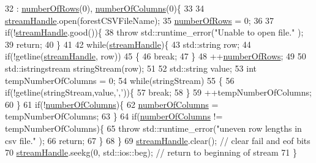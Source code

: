 \begin{DoxyCode}
32                                                           : \hyperlink{classfp_1_1csvHandle_a07cf6b14355c5fa81643a7bb6e9c681f}{numberOfRows}(0), 
      \hyperlink{classfp_1_1csvHandle_ae3e5280846df348d0b1b86b78f2e3682}{numberOfColumns}(0)\{
33 
34                 \hyperlink{classfp_1_1csvHandle_a42c4ad8f38a95c724dfa2b173991a524}{streamHandle}.open(forestCSVFileName);
35                 \hyperlink{classfp_1_1csvHandle_a07cf6b14355c5fa81643a7bb6e9c681f}{numberOfRows} = 0;
36 
37                 \textcolor{keywordflow}{if}(!\hyperlink{classfp_1_1csvHandle_a42c4ad8f38a95c724dfa2b173991a524}{streamHandle}.good())\{
38                     \textcolor{keywordflow}{throw} std::runtime\_error(\textcolor{stringliteral}{"Unable to open file."} );
39                     \textcolor{keywordflow}{return};
40                 \}
41 
42                 \textcolor{keywordflow}{while}(\hyperlink{classfp_1_1csvHandle_a42c4ad8f38a95c724dfa2b173991a524}{streamHandle})\{
43                     std::string row;
44                     \textcolor{keywordflow}{if}(!getline(\hyperlink{classfp_1_1csvHandle_a42c4ad8f38a95c724dfa2b173991a524}{streamHandle}, row))
45                     \{
46                         \textcolor{keywordflow}{break};
47                     \}
48                     ++\hyperlink{classfp_1_1csvHandle_a07cf6b14355c5fa81643a7bb6e9c681f}{numberOfRows};
49 
50                     std::istringstream stringStream(row);
51 
52                     std::string value;
53                     \textcolor{keywordtype}{int} tempNumberOfColumns = 0;
54                     \textcolor{keywordflow}{while}(stringStream)
55                     \{
56                         \textcolor{keywordflow}{if}(!getline(stringStream,value,\textcolor{charliteral}{','}))\{
57                             \textcolor{keywordflow}{break};
58                         \}
59                         ++tempNumberOfColumns;
60                     \}
61                     \textcolor{keywordflow}{if}(!\hyperlink{classfp_1_1csvHandle_ae3e5280846df348d0b1b86b78f2e3682}{numberOfColumns})\{
62                         \hyperlink{classfp_1_1csvHandle_ae3e5280846df348d0b1b86b78f2e3682}{numberOfColumns} = tempNumberOfColumns; 
63                     \}
64                     \textcolor{keywordflow}{if}(\hyperlink{classfp_1_1csvHandle_ae3e5280846df348d0b1b86b78f2e3682}{numberOfColumns} != tempNumberOfColumns)\{
65                         \textcolor{keywordflow}{throw} std::runtime\_error(\textcolor{stringliteral}{"uneven row lengths in csv file."} );
66                         \textcolor{keywordflow}{return};
67                     \}
68                 \}
69                 \hyperlink{classfp_1_1csvHandle_a42c4ad8f38a95c724dfa2b173991a524}{streamHandle}.clear(); \textcolor{comment}{// clear fail and eof bits}
70                 \hyperlink{classfp_1_1csvHandle_a42c4ad8f38a95c724dfa2b173991a524}{streamHandle}.seekg(0, std::ios::beg); \textcolor{comment}{// return to beginning of stream}
71             \}
\end{DoxyCode}


